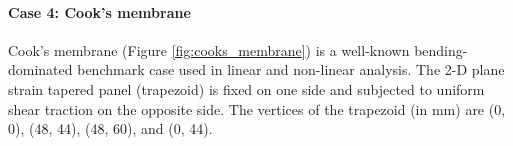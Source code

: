 \documentclass[sn-mathphys,Numbered]{sn-jnl}%
\begin{document}
\paragraph{Case 4: Cook's membrane}
Cook's membrane (Figure \ref{fig:cooks_membrane}) is a well-known bending-dominated benchmark case used in linear and non-linear analysis.
The 2-D plane strain tapered panel (trapezoid) is fixed on one side and subjected to uniform shear traction on the opposite side.
The vertices of the trapezoid (in mm) are (0, 0), (48, 44), (48, 60),  and (0, 44).
\end{document}
